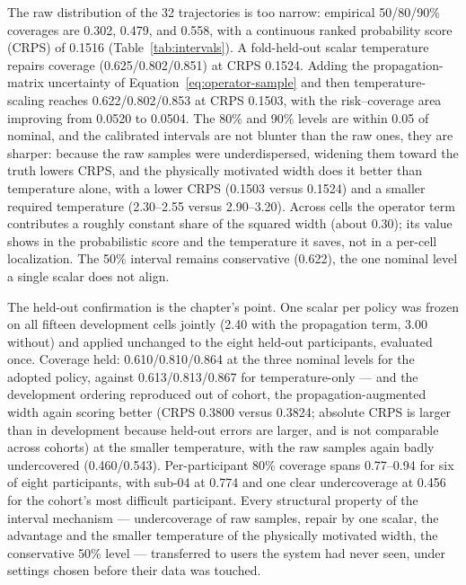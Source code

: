 The raw distribution of the 32 trajectories is too narrow: empirical 50/80/90\% coverages are 0.302, 0.479, and 0.558, with a continuous ranked probability score (CRPS) of 0.1516 (Table~\ref{tab:intervals}). A fold-held-out scalar temperature repairs coverage (0.625/0.802/0.851) at CRPS 0.1524. Adding the propagation-matrix uncertainty of Equation~\ref{eq:operator-sample} and then temperature-scaling reaches 0.622/0.802/0.853 at CRPS 0.1503, with the risk--coverage area improving from 0.0520 to 0.0504. The 80\% and 90\% levels are within 0.05 of nominal, and the calibrated intervals are not blunter than the raw ones, they are sharper: because the raw samples were underdispersed, widening them toward the truth lowers CRPS, and the physically motivated width does it better than temperature alone, with a lower CRPS (0.1503 versus 0.1524) and a smaller required temperature (2.30--2.55 versus 2.90--3.20). Across cells the operator term contributes a roughly constant share of the squared width (about 0.30); its value shows in the probabilistic score and the temperature it saves, not in a per-cell localization. The 50\% interval remains conservative (0.622), the one nominal level a single scalar does not align.

The held-out confirmation is the chapter's point. One scalar per policy was frozen on all fifteen development cells jointly (2.40 with the propagation term, 3.00 without) and applied unchanged to the eight held-out participants, evaluated once. Coverage held: 0.610/0.810/0.864 at the three nominal levels for the adopted policy, against 0.613/0.813/0.867 for temperature-only --- and the development ordering reproduced out of cohort, the propagation-augmented width again scoring better (CRPS 0.3800 versus 0.3824; absolute CRPS is larger than in development because held-out errors are larger, and is not comparable across cohorts) at the smaller temperature, with the raw samples again badly undercovered (0.460/0.543). Per-participant 80\% coverage spans 0.77--0.94 for six of eight participants, with sub-04 at 0.774 and one clear undercoverage at 0.456 for the cohort's most difficult participant. Every structural property of the interval mechanism --- undercoverage of raw samples, repair by one scalar, the advantage and the smaller temperature of the physically motivated width, the conservative 50\% level --- transferred to users the system had never seen, under settings chosen before their data was touched.

